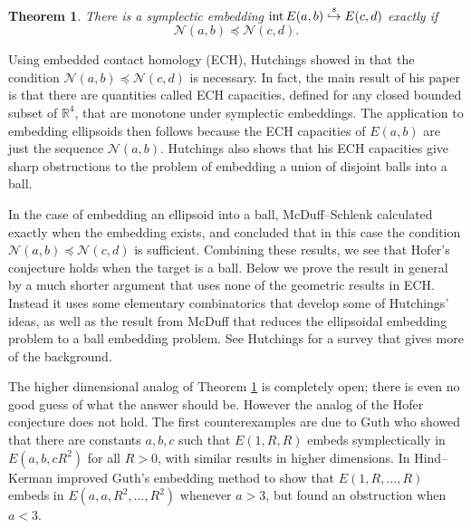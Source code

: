 \documentclass[11pt]{amsart}
\newcommand{\labell}[1] {\label{#1}}
\newcommand{\1}{{{\mathchoice {\rm 1\mskip-4mu l} {\rm 1\mskip-4mu l}
{\rm 1\mskip-4.5mu l} {\rm 1\mskip-5mu l}}}}
\newcommand{\intt}{{\rm int\,}}
\newcommand{\R}{{\mathbb R}}
\newcommand{\Nn}{{\mathcal N}}
\newcommand{\se} {{\stackrel{s}\hookrightarrow}}
\newtheorem{thm}[theorem]{Theorem}
\numberwithin{figure}{section}
\numberwithin{equation}{section}
\begin{document}
\begin{thm}\labell{thm:hof}  There is a symplectic embedding $\intt E(a,b)\;\se \; E(c,d)$ exactly if
$$
\Nn(a,b)  \preccurlyeq \Nn(c,d).
$$
\end{thm}


Using embedded contact homology (ECH), 
Hutchings showed in \cite{H} that the condition  $\Nn(a,b)  \preccurlyeq \Nn(c,d)$ 
is necessary.  
In fact, the main result of his paper is that there are quantities 
called ECH capacities, 
defined for any closed bounded subset of $\R^4$, 
that are monotone under symplectic embeddings.  The application to embedding ellipsoids
then follows because  
 the ECH capacities of $E(a,b)$ are just the sequence $\Nn(a,b)$. 
  Hutchings also shows that his ECH capacities give sharp obstructions 
  to the problem of embedding a union of disjoint balls into a ball. 
  
In the case of embedding an ellipsoid into a ball,
McDuff--Schlenk \cite[Thm.~1.1.3]{MS}  calculated exactly when 
the embedding exists, and concluded that in this case 
the condition  $\Nn(a,b)  \preccurlyeq \Nn(c,d)$ 
is sufficient.   Combining these results, we see
that Hofer's conjecture holds when the target is a ball.   
Below we prove the result in general by a much shorter argument
that uses none of the geometric results in ECH. 
Instead it uses some elementary combinatorics  that develop some of 
Hutchings'  ideas,
as well as the result from McDuff \cite{M} that reduces the 
ellipsoidal embedding problem to a ball embedding problem.
See Hutchings \cite{Hs} for a survey that gives more of the background.

The higher dimensional analog of Theorem \ref{thm:hof}  is completely open; there is even no good guess of what the answer should be. However the analog of the Hofer conjecture does not hold.  The first counterexamples are due to Guth \cite{Gu}  who showed that there are constants $a,b,c$ such that   $E(1,R,R)$ embeds symplectically in $ E(a,b,cR^2)$ for all $R>0$, with similar results in higher dimensions.   In \cite{HK} Hind--Kerman improved Guth's embedding method to
show that $E(1,R,\dots, R)$ embeds in $E(a,a,R^2,\dots,R^2)$
whenever $a> 3$, but found an obstruction when $a< 3$.
\end{document}
